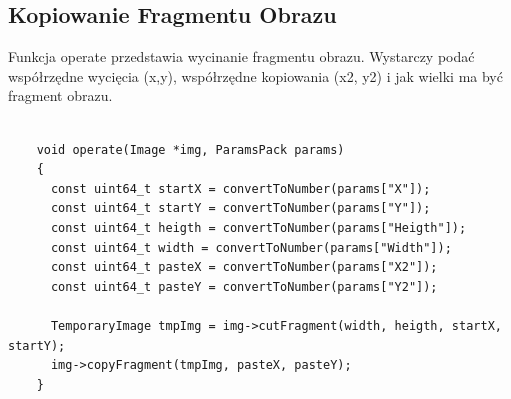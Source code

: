 \documentclass{article}
\begin{document}
\FloatBarrier
\subsection{Kopiowanie Fragmentu Obrazu}
Funkcja operate przedstawia wycinanie fragmentu obrazu. Wystarczy podać współrzędne wycięcia (x,y), współrzędne kopiowania (x2, y2) i jak wielki ma być fragment obrazu.
\begin{Verbatim}[frame=single,label=Kopiowanie Fragmentu Obrazu (Source Code)]

    void operate(Image *img, ParamsPack params)
    {
      const uint64_t startX = convertToNumber(params["X"]);
      const uint64_t startY = convertToNumber(params["Y"]);
      const uint64_t heigth = convertToNumber(params["Heigth"]);
      const uint64_t width = convertToNumber(params["Width"]);
      const uint64_t pasteX = convertToNumber(params["X2"]);
      const uint64_t pasteY = convertToNumber(params["Y2"]);
	
      TemporaryImage tmpImg = img->cutFragment(width, heigth, startX, startY);
      img->copyFragment(tmpImg, pasteX, pasteY);
    }

\end{Verbatim}
\end{document}
